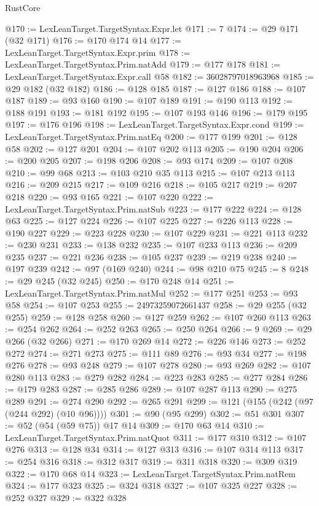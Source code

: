 \begin{lexlean}{RustCore}
\begin{coremodule}
@170 := LexLeanTarget.TargetSyntax.Expr.let
@171 := 7
@174 := @29 @171 (@32 @171)
@176 := @170 @174 @14
@177 := LexLeanTarget.TargetSyntax.Expr.prim
@178 := LexLeanTarget.TargetSyntax.Prim.natAdd
@179 := @177 @178
@181 := LexLeanTarget.TargetSyntax.Expr.call @58
@182 := 36028797018963968
@185 := @29 @182 (@32 @182)
@186 := @128 @185
@187 := @127 @186
@188 := @107 @187
@189 := @93 @160
@190 := @107 @189
@191 := @190 @113
@192 := @188 @191
@193 := @181 @192
@195 := @107 @193 @146
@196 := @179 @195
@197 := @176 @196
@198 := LexLeanTarget.TargetSyntax.Expr.cond
@199 := LexLeanTarget.TargetSyntax.Prim.natEq
@200 := @177 @199
@201 := @128 @58
@202 := @127 @201
@204 := @107 @202 @113
@205 := @190 @204
@206 := @200 @205
@207 := @198 @206
@208 := @93 @174
@209 := @107 @208
@210 := @99 @68
@213 := @103 @210 @35 @113
@215 := @107 @213 @113
@216 := @209 @215
@217 := @109 @216
@218 := @105 @217
@219 := @207 @218
@220 := @93 @165
@221 := @107 @220
@222 := LexLeanTarget.TargetSyntax.Prim.natSub
@223 := @177 @222
@224 := @128 @63
@225 := @127 @224
@226 := @107 @225
@227 := @226 @113
@228 := @190 @227
@229 := @223 @228
@230 := @107 @229
@231 := @221 @113
@232 := @230 @231
@233 := @138 @232
@235 := @107 @233 @113
@236 := @209 @235
@237 := @221 @236
@238 := @105 @237
@239 := @219 @238
@240 := @197 @239
@242 := @97 (@169 @240)
@244 := @98 @210 @75
@245 := 8
@248 := @29 @245 (@32 @245)
@250 := @170 @248 @14
@251 := LexLeanTarget.TargetSyntax.Prim.natMul
@252 := @177 @251
@253 := @93 @58
@254 := @107 @253
@255 := 24973259072661437
@258 := @29 @255 (@32 @255)
@259 := @128 @258
@260 := @127 @259
@262 := @107 @260 @113
@263 := @254 @262
@264 := @252 @263
@265 := @250 @264
@266 := 9
@269 := @29 @266 (@32 @266)
@271 := @170 @269 @14
@272 := @226 @146
@273 := @252 @272
@274 := @271 @273
@275 := @111 @89
@276 := @93 @34
@277 := @198 @276
@278 := @93 @248
@279 := @107 @278
@280 := @93 @269
@282 := @107 @280 @113
@283 := @279 @282
@284 := @223 @283
@285 := @277 @284
@286 := @179 @283
@287 := @285 @286
@289 := @107 @287 @113
@290 := @275 @289
@291 := @274 @290
@292 := @265 @291
@299 := @121 (@155 (@242 (@97 (@244 @292) (@10 @96))))
@301 := @90 (@95 @299)
@302 := @51 @301
@307 := @52 (@54 (@59 @75)) @17 @14
@309 := @170 @63 @14
@310 := LexLeanTarget.TargetSyntax.Prim.natQuot
@311 := @177 @310
@312 := @107 @276
@313 := @128 @34
@314 := @127 @313
@316 := @107 @314 @113
@317 := @254 @316
@318 := @312 @317
@319 := @311 @318
@320 := @309 @319
@322 := @170 @68 @14
@323 := LexLeanTarget.TargetSyntax.Prim.natRem
@324 := @177 @323
@325 := @324 @318
@327 := @107 @325 @227
@328 := @252 @327
@329 := @322 @328

\end{coremodule}
\end{lexlean}
